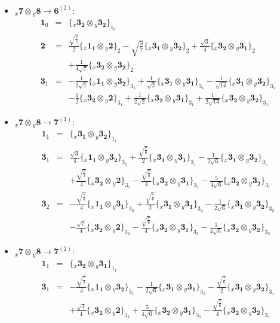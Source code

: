 \documentclass[english]{article}
\newcommand{\rep}[1]{\mathbf{#1}}
\newcommand{\repx}[2]{{}_{#2}\mathbf{#1}}
\newcommand{\subcg}[3]{\big\{ \repx{#1}{x}\otimes\repx{#2}{y}\big\}^{}_{#3}}
\begin{document}
\begin{itemize}
\begin{eqnarray*}
\end{eqnarray*}
\item $\repx{7}{x}\otimes\repx{8}{y}\to\rep{6}^{(2)}$:
\begin{eqnarray*}
\rep{1}_{0} &=& \subcg{3_{2}}{3_{2}}{1_{0}}
\\
\rep{2} &=& \frac{\sqrt{\frac{3}{2}}}{2}\subcg{1_{1}}{2}{2}-\sqrt{\frac{3}{7}}\subcg{3_{1}}{3_{2}}{2}+\frac{\sqrt{3}}{4}\subcg{3_{2}}{3_{1}}{2} \\ 
 & & +\frac{1}{4 \sqrt{7}}\subcg{3_{2}}{3_{2}}{2}
\\
\rep{3}_{1} &=& -\frac{1}{2 \sqrt{7}}\subcg{1_{1}}{3_{2}}{3_{1}}+\frac{1}{\sqrt{2}}\subcg{3_{1}}{3_{1}}{3_{1}}-\frac{1}{\sqrt{14}}\subcg{3_{1}}{3_{2}}{3_{1}} \\ 
 & & -\frac{1}{2}\subcg{3_{2}}{2}{3_{1}}+\frac{1}{2 \sqrt{2}}\subcg{3_{2}}{3_{1}}{3_{1}}+\frac{1}{2 \sqrt{14}}\subcg{3_{2}}{3_{2}}{3_{1}}
\end{eqnarray*}
\item $\repx{7}{x}\otimes\repx{8}{y}\to\rep{7}^{(1)}$:
\begin{eqnarray*}
\rep{1}_{1} &=& \subcg{3_{1}}{3_{2}}{1_{1}}
\\
\rep{3}_{1} &=& \frac{\sqrt{3}}{4}\subcg{1_{1}}{3_{2}}{3_{1}}+\frac{\sqrt{\frac{7}{6}}}{2}\subcg{3_{1}}{3_{1}}{3_{1}}-\frac{1}{2 \sqrt{6}}\subcg{3_{1}}{3_{2}}{3_{1}} \\ 
 & & +\frac{\sqrt{\frac{7}{3}}}{4}\subcg{3_{2}}{2}{3_{1}}-\frac{\sqrt{\frac{7}{6}}}{4}\subcg{3_{2}}{3_{1}}{3_{1}}-\frac{5}{4 \sqrt{6}}\subcg{3_{2}}{3_{2}}{3_{1}}
\\
\rep{3}_{2} &=& -\frac{\sqrt{\frac{7}{3}}}{4}\subcg{1_{1}}{3_{1}}{3_{2}}+\frac{\sqrt{\frac{7}{6}}}{2}\subcg{3_{1}}{3_{1}}{3_{2}}-\frac{1}{2 \sqrt{6}}\subcg{3_{1}}{3_{2}}{3_{2}} \\ 
 & & -\frac{\sqrt{7}}{4}\subcg{3_{2}}{2}{3_{2}}-\frac{\sqrt{\frac{7}{6}}}{4}\subcg{3_{2}}{3_{1}}{3_{2}}-\frac{1}{4 \sqrt{6}}\subcg{3_{2}}{3_{2}}{3_{2}}
\end{eqnarray*}
\item $\repx{7}{x}\otimes\repx{8}{y}\to\rep{7}^{(2)}$:
\begin{eqnarray*}
\rep{1}_{1} &=& \subcg{3_{2}}{3_{1}}{1_{1}}
\\
\rep{3}_{1} &=& -\frac{\sqrt{\frac{7}{3}}}{4}\subcg{1_{1}}{3_{2}}{3_{1}}-\frac{1}{2 \sqrt{6}}\subcg{3_{1}}{3_{1}}{3_{1}}-\frac{\sqrt{\frac{7}{6}}}{2}\subcg{3_{1}}{3_{2}}{3_{1}} \\ 
 & & +\frac{\sqrt{3}}{4}\subcg{3_{2}}{2}{3_{1}}+\frac{5}{4 \sqrt{6}}\subcg{3_{2}}{3_{1}}{3_{1}}-\frac{\sqrt{\frac{7}{6}}}{4}\subcg{3_{2}}{3_{2}}{3_{1}}

\end{eqnarray*}
\end{itemize}
\end{document}
